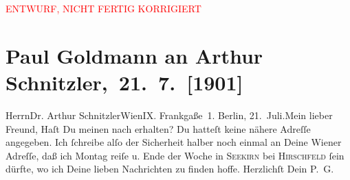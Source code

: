 
\begin{center}
            \textcolor{red}{ENTWURF, NICHT FERTIG KORRIGIERT}
                      \end{center}
            
         
         \renewcommand{\erwaehntePersonen}{Personen: Robert Hirschfeld}
         \renewcommand{\erwaehnteOrte}{Orte: Berlin, Frankgasse, Sekirn, Vahrn, Wien}
         \renewcommand{\erwaehnteWerke}{}
               \section[ Paul Goldmann an Arthur Schnitzler, 21. 7. {[}1901{]}]{ Paul Goldmann an Arthur Schnitzler, 21. 7. {[}1901{]}}\nopagebreak{}\rehead{ }\begin{ledgroupsized}[t]{13cm}\normalsize\beginnumbering \toendnotes[C]{\smallbreak\pagebreak[2]} 
\toendnotes[C]{\smallbreak}\pstart{}{\pb}Herrn\pend{}\pstart{}Dr. Arthur Schnitzler\pend{}\pstart{}Wien\pend{}\pstart{}IX. Frankgaße 1.\pend{}{\bigskip}\pstart
           \noindent{}{\pb}Berlin, 21. Juli.\hfill Mein lieber Freund,\pend
           \pstart
           Haſt Du meinen nach \label{K_L03074-22v}\label{K_L03074-22h} erhalten? Du
               hatteſt keine nähere Adreſſe angegeben. Ich ſchreibe alſo der Sicherheit halber noch
               einmal an Deine Wiener Adreſſe, daß ich Montag reiſe u. Ende der Woche in \textsc{Seekirn} bei \textsc{Hirschfeld} ſein dürfte, wo ich Deine lieben Nachrichten zu finden hoffe. 
            \pend
           \pstart Herzlichſt Dein
               \spacefill\mbox{P. G.}\pend{}
         
         \endnumbering{}\end{ledgroupsized}  \newcommand{\dateiname}{L03074}\newcommand{\titel}{Paul Goldmann an Arthur Schnitzler, 21. 7. [1901]}\newcommand{\editorInnen}{Martin Anton Müller und Laura Untner}
      